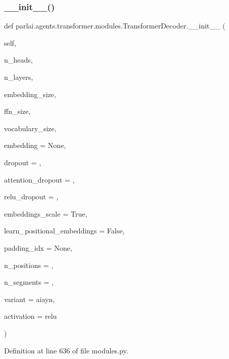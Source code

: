 \subsubsection{\texorpdfstring{\+\_\+\+\_\+init\+\_\+\+\_\+()}{\_\_init\_\_()}}
{\footnotesize\ttfamily def parlai.\+agents.\+transformer.\+modules.\+Transformer\+Decoder.\+\_\+\+\_\+init\+\_\+\+\_\+ (\begin{DoxyParamCaption}\item[{}]{self,  }\item[{}]{n\+\_\+heads,  }\item[{}]{n\+\_\+layers,  }\item[{}]{embedding\+\_\+size,  }\item[{}]{ffn\+\_\+size,  }\item[{}]{vocabulary\+\_\+size,  }\item[{}]{embedding = {\ttfamily None},  }\item[{}]{dropout = {},  }\item[{}]{attention\+\_\+dropout = {},  }\item[{}]{relu\+\_\+dropout = {},  }\item[{}]{embeddings\+\_\+scale = {\ttfamily True},  }\item[{}]{learn\+\_\+positional\+\_\+embeddings = {\ttfamily False},  }\item[{}]{padding\+\_\+idx = {\ttfamily None},  }\item[{}]{n\+\_\+positions = {},  }\item[{}]{n\+\_\+segments = {},  }\item[{}]{variant = {\ttfamily \textquotesingle{}aiayn\textquotesingle{}},  }\item[{}]{activation = {\ttfamily \textquotesingle{}relu\textquotesingle{}} }\end{DoxyParamCaption})}



Definition at line 636 of file modules.\+py.


